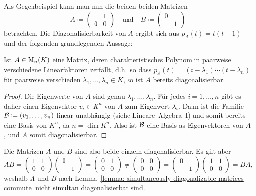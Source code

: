 Als Gegenbeispiel kann man nun die beiden beiden Matrizen
\[
            A
  \coloneqq \begin{pmatrix}
              1 & 1
              \\
              0 & 0
            \end{pmatrix}
  \quad\text{und}\quad
            B
  \coloneqq \begin{pmatrix}
              0 & 
              \\
                & 1
            \end{pmatrix}
\]
betrachten.
Die Diagonalisierbarkeit von $A$ ergibt sich aus $p_A(t) = t(t-1)$ und der folgenden grundlegenden Aussage:

\begin{lemma}
  \label{lemma: matrices with pairwise different eigenvalues are diagonalizable}
  Ist $A \in \operatorname{M}_{n}(K)$ eine Matrix, deren charakteristisches Polynom in paarweise verschiedene Linearfaktoren zerfällt, d.h.\ so dass $p_A(t) = (t - \lambda_1) \dotsm (t - \lambda_n)$ für paarweise verschieden $\lambda_1, \dotsc, \lambda_n \in K$, so ist $A$ bereits diagonalisierbar.
\end{lemma}
\begin{proof}
  Die Eigenwerte von $A$ sind genau $\lambda_1, \dotsc, \lambda_n$.
  Für jedes $i = 1, \dotsc, n$ gibt es daher einen Eigenvektor $v_i \in K^n$ von $A$ zum Eigenwert $\lambda_i$.
  Dann ist die Familie $\mathcal{B} \coloneqq (v_1, \dotsc, v_n)$ linear unabhängig (siehe Lineare~Algebra~I) und somit bereits eine Basis von $K^n$, da $n = \dim K^n$.
  Also ist $\mathcal{B}$ eine Basis as Eigenvektoren von $A$, und $A$ somit diagonalisierbar.
\end{proof}

Die Matrizen $A$ und $B$ sind also beide einzeln diagonalisierbar.
Es gilt aber
\[
        A B
  =     \begin{pmatrix}
          1 & 1
          \\
          0 & 0
        \end{pmatrix}
        \begin{pmatrix}
          0 & 
          \\
            & 1
        \end{pmatrix}
  =     \begin{pmatrix}
          0 & 1
          \\
          0 & 0
        \end{pmatrix}
  \neq  \begin{pmatrix}
          0 & 0
          \\
          0 & 0
        \end{pmatrix}
  =     \begin{pmatrix}
          0 & 
          \\
            & 1
        \end{pmatrix}
        \begin{pmatrix}
          1 & 1
          \\
          0 & 0
        \end{pmatrix}
  =     B A,
\]
weshalb $A$ und $B$ nach Lemma~\ref{lemma: simultaneously diagonalizable matrices commute} nicht simultan diagonalisierbar sind.

